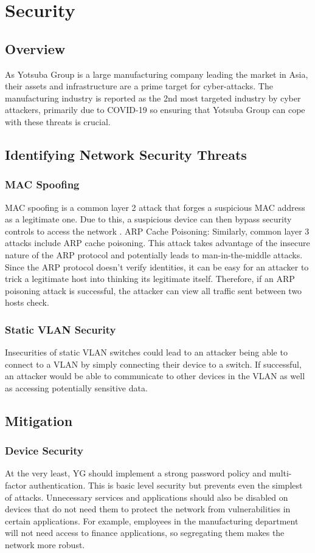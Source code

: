 \chapter{Security}

\section{Overview}
As Yotsuba Group is a large manufacturing company leading the market in Asia, their assets and infrastructure are a prime target for cyber-attacks. The manufacturing industry is reported as the 2nd most targeted industry by cyber attackers, primarily due to COVID-19 \parencite{top7-BitLyft} so ensuring that Yotsuba Group can cope with these threats is crucial.
\section{Identifying Network Security Threats}
\subsection{MAC Spoofing}
 MAC spoofing is a common layer 2 attack that forges a suspicious MAC address as a legitimate one. Due to this, a suspicious device can then bypass security controls to access the network \parencite{mac-spoofing}.
ARP Cache Poisoning: Similarly, common layer 3 attacks include ARP cache poisoning. This attack takes advantage of the insecure nature of the ARP protocol and potentially leads to man-in-the-middle attacks. Since the ARP protocol doesn't verify identities, it can be easy for an attacker to trick a legitimate host into thinking its legitimate itself. Therefore, if an ARP poisoning attack is successful, the attacker can view all traffic sent between two hosts \parencite{arp-posioning} check.
\subsection{Static VLAN Security}
Insecurities of static VLAN switches could lead to an attacker being able to connect to a VLAN by simply connecting their device to a switch. If successful, an attacker would be able to communicate to other devices in the VLAN as well as accessing potentially sensitive data.

\section{Mitigation}
\subsection{Device Security}
At the very least, YG should implement a strong password policy and multi-factor authentication. This is basic level security but prevents even the simplest of attacks. Unnecessary services and applications should also be disabled on devices that do not need them to protect the network from vulnerabilities in certain applications. For example, employees in the manufacturing department will not need access to finance applications, so segregating them makes the network more robust.
